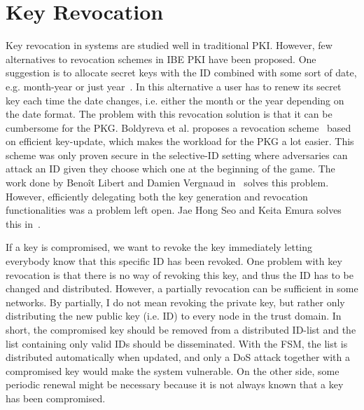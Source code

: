\section{Key Revocation}
Key revocation in systems are studied well in traditional \gls{PKI}.
However, few alternatives to revocation schemes in \gls{IBE} \gls{PKI} have been proposed.
One suggestion is to allocate secret keys with the \gls{ID} combined with some sort of date, e.g. month-year or just year~\cite[section 1.1.1]{DBLP:conf/crypto/BonehF01}. 
In this alternative a user has to renew its secret key each time the date changes, i.e. either the month or the year depending on the date format.
The problem with this revocation solution is that it can be cumbersome for the \gls{PKG}.
Boldyreva et al. proposes a revocation scheme~\cite{DBLP:journals/iacr/BoldyrevaGK12} based on efficient key-update, which makes the workload for the \gls{PKG} a lot easier. 
This scheme was only proven secure in the selective-ID setting where adversaries can attack an \gls{ID} given they choose which one at the beginning of the game.
The work done by Beno\^{i}t Libert and Damien Vergnaud in~\cite{DBLP:conf/ctrsa/LibertV09} solves this problem. 
However, efficiently delegating both the key generation and revocation functionalities was a problem left open.
Jae Hong Seo and Keita Emura solves this in~\cite{DBLP:journals/iacr/SeoE13a}.

If a key is compromised, we want to revoke the key immediately letting everybody know that this specific \gls{ID} has been revoked. 
One problem with key revocation is that there is no way of revoking this key, and thus the \gls{ID} has to be changed and distributed. 
However, a partially revocation can be sufficient in some networks. 
By partially, I do not mean revoking the private key, but rather only distributing the new public key (i.e. \gls{ID}) to every node in the trust domain.
In short, the compromised key should be removed from a distributed ID-list and the list containing only valid \gls{ID}s should be disseminated.
With the \gls{FSM}, the list is distributed automatically when updated, and only a \gls{DoS} attack together with a compromised key would make the system vulnerable. 
On the other side, some periodic renewal might be necessary because it is not always known that a key has been compromised.
